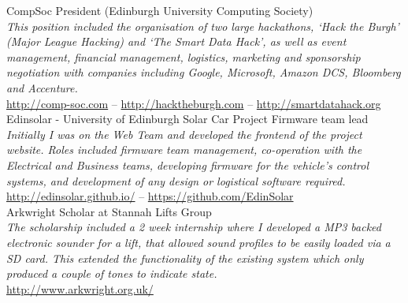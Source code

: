 \documentclass[10pt, a4paper]{article}
\newcommand{\years}[1]{\marginnote{\scriptsize #1}}
\begin{document}
\years{Sept 2014 -\\ May 2015} CompSoc President (Edinburgh University Computing Society) \\
\emph{This position included the organisation of two large hackathons, `Hack the Burgh' (Major League Hacking)
  and `The Smart Data Hack', as well as event management, financial management, logistics, marketing and sponsorship negotiation with companies including Google, Microsoft, Amazon DCS, Bloomberg and Accenture.} \\
\href{https://comp-soc.com}{http://comp-soc.com} --
\href{http://hacktheburgh.com}{http://hacktheburgh.com} --
\href{http://smartdatahack.org}{http://smartdatahack.org}\\

\years{2014-2015} Edinsolar - University of Edinburgh Solar Car Project Firmware team lead \\
\emph{Initially I was on the Web Team and developed the frontend of the project website. Roles included firmware team management, co-operation with the Electrical and Business teams, developing firmware for the vehicle's control systems, and development of any design or logistical software required.} \\
\href{http://edinsolar.github.io/}{http://edinsolar.github.io/} -- 
\href{https://github.com/EdinSolar}{https://github.com/EdinSolar} \\


\years{2012} Arkwright Scholar at Stannah Lifts Group \\
\emph{The scholarship included a 2 week internship where I developed a MP3 backed electronic sounder for a lift, 
  that allowed sound profiles to be easily loaded via a SD card. This extended the functionality of the 
  existing system which only produced a couple of tones to indicate state.} \\
\href{http://www.arkwright.org.uk/}{http://www.arkwright.org.uk/}\\
\end{document}
